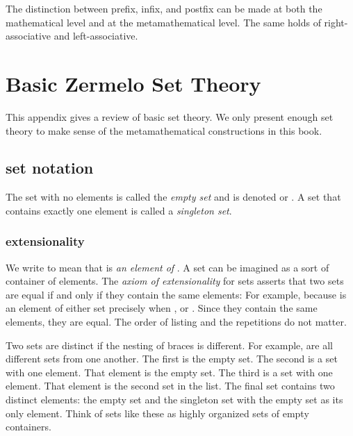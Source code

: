 \documentclass[cup9a]{cupbook}
\begin{document}
The distinction between prefix, infix, and postfix can be made at both the mathematical level and at the metamathematical level.  The same holds of right-associative and left-associative.

\chapter{Basic Zermelo Set Theory}

This appendix gives a review of basic set theory.  We only present enough set theory to make sense of the metamathematical constructions in this book.

\section{set notation}

The set with no elements is called the {\it empty set} and is denoted \mc{$\emptyset$} or \mc{$\{\}$}.
A set  that contains exactly one element  is called a {\it singleton set}. 

\subsection{extensionality}

We write  to mean that  is {\it an element of} .  A set can be imagined as a sort of container of elements.  The {\it axiom of extensionality} for sets asserts that two sets are equal if and only if they contain the same elements:
For example,
because  is an element of either set precisely when , or .
Since they contain the same elements, they are equal.  The order of listing and the repetitions do not matter.

Two sets are distinct if the nesting of braces is different.
For example,
\mc{$$
\{\},\quad \{\{\}\},\quad \{\{\{\}\}\},\quad \{\{\},\{\{\}\}\}
$$}
are all different sets from one another.  The first is the empty set.
The second is a set with one element.  That element is the empty set.
The third is a set with one element.  That element is the second set in the list.  The final set contains two distinct elements: the empty set and the singleton set with the empty set as its only element.  Think of sets like these as highly organized sets of empty containers.
\end{document}
